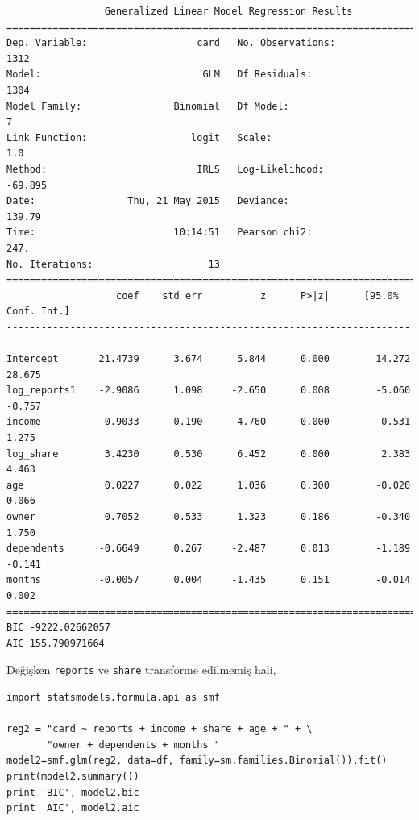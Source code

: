 \documentclass[12pt,fleqn]{article}\usepackage{../../common}
\begin{document}
\begin{verbatim}
                 Generalized Linear Model Regression Results                  
==============================================================================
Dep. Variable:                   card   No. Observations:                 1312
Model:                            GLM   Df Residuals:                     1304
Model Family:                Binomial   Df Model:                            7
Link Function:                  logit   Scale:                             1.0
Method:                          IRLS   Log-Likelihood:                -69.895
Date:                Thu, 21 May 2015   Deviance:                       139.79
Time:                        10:14:51   Pearson chi2:                     247.
No. Iterations:                    13                                         
================================================================================
                   coef    std err          z      P>|z|      [95.0% Conf. Int.]
--------------------------------------------------------------------------------
Intercept       21.4739      3.674      5.844      0.000        14.272    28.675
log_reports1    -2.9086      1.098     -2.650      0.008        -5.060    -0.757
income           0.9033      0.190      4.760      0.000         0.531     1.275
log_share        3.4230      0.530      6.452      0.000         2.383     4.463
age              0.0227      0.022      1.036      0.300        -0.020     0.066
owner            0.7052      0.533      1.323      0.186        -0.340     1.750
dependents      -0.6649      0.267     -2.487      0.013        -1.189    -0.141
months          -0.0057      0.004     -1.435      0.151        -0.014     0.002
================================================================================
BIC -9222.02662057
AIC 155.790971664
\end{verbatim}

Değişken \verb!reports! ve \verb!share! transforme edilmemiş hali,

\begin{verbatim}
import statsmodels.formula.api as smf

reg2 = "card ~ reports + income + share + age + " + \
       "owner + dependents + months "
model2=smf.glm(reg2, data=df, family=sm.families.Binomial()).fit()
print(model2.summary())
print 'BIC', model2.bic
print 'AIC', model2.aic
\end{verbatim}
\end{document}

